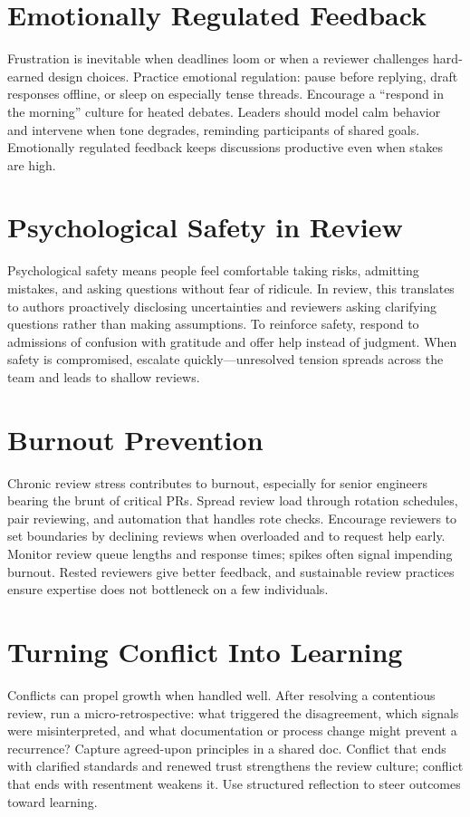 \section{Emotionally Regulated Feedback}
Frustration is inevitable when deadlines loom or when a reviewer challenges hard-earned design choices. Practice emotional regulation: pause before replying, draft responses offline, or sleep on especially tense threads. Encourage a ``respond in the morning'' culture for heated debates. Leaders should model calm behavior and intervene when tone degrades, reminding participants of shared goals. Emotionally regulated feedback keeps discussions productive even when stakes are high.

\section{Psychological Safety in Review}
Psychological safety means people feel comfortable taking risks, admitting mistakes, and asking questions without fear of ridicule. In review, this translates to authors proactively disclosing uncertainties and reviewers asking clarifying questions rather than making assumptions. To reinforce safety, respond to admissions of confusion with gratitude and offer help instead of judgment. When safety is compromised, escalate quickly---unresolved tension spreads across the team and leads to shallow reviews.

\section{Burnout Prevention}
Chronic review stress contributes to burnout, especially for senior engineers bearing the brunt of critical PRs. Spread review load through rotation schedules, pair reviewing, and automation that handles rote checks. Encourage reviewers to set boundaries by declining reviews when overloaded and to request help early. Monitor review queue lengths and response times; spikes often signal impending burnout. Rested reviewers give better feedback, and sustainable review practices ensure expertise does not bottleneck on a few individuals.

\section{Turning Conflict Into Learning}
Conflicts can propel growth when handled well. After resolving a contentious review, run a micro-retrospective: what triggered the disagreement, which signals were misinterpreted, and what documentation or process change might prevent a recurrence? Capture agreed-upon principles in a shared doc. Conflict that ends with clarified standards and renewed trust strengthens the review culture; conflict that ends with resentment weakens it. Use structured reflection to steer outcomes toward learning.


